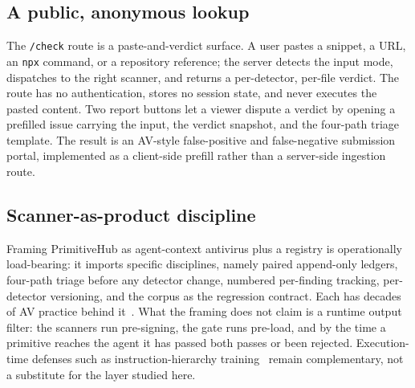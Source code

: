 \subsection{A public, anonymous lookup}

The \texttt{/check} route is a paste-and-verdict surface. A user pastes
a snippet, a URL, an \texttt{npx} command, or a repository reference;
the server detects the input mode, dispatches to the right scanner, and
returns a per-detector, per-file verdict. The route has no
authentication, stores no session state, and never executes the pasted
content. Two report buttons let a viewer dispute a verdict by opening a
prefilled issue carrying the input, the verdict snapshot, and the
four-path triage template. The result is an AV-style false-positive and
false-negative submission portal, implemented as a client-side prefill
rather than a server-side ingestion route.

\subsection{Scanner-as-product discipline}

Framing PrimitiveHub as agent-context antivirus plus a registry is
operationally load-bearing: it imports specific disciplines, namely
paired append-only ledgers, four-path triage before any detector change,
numbered per-finding tracking, per-detector versioning, and the corpus
as the regression contract. Each has decades of AV practice behind
it~\cite{Christodorescu:2003:static-malware}. What the framing
does not claim is a runtime output filter: the scanners run pre-signing,
the gate runs pre-load, and by the time a primitive reaches the agent it
has passed both passes or been rejected. Execution-time defenses such as
instruction-hierarchy training~\cite{Wallace:2024:instruction-hierarchy}
remain complementary, not a substitute for the layer studied here.
